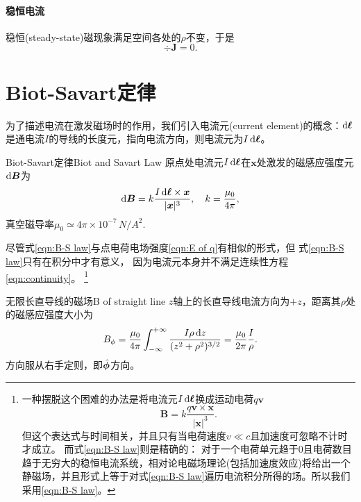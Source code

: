 \paragraph{稳恒电流}
稳恒(steady-state)磁现象满足空间各处的$\rho$不变，于是%
\begin{equation}
    \div\bm J=0.
\end{equation}

\section{Biot-Savart定律}
\label{sec:Biot-Savart law}

为了描述电流在激发磁场时的作用，我们引入电流元(current element)的概念：$\mathop{}\!\mathrm{d}\bm\ell$是通电流$I$的导线的长度元，指向电流方向，则电流元为$I\mathop{}\!\mathrm{d}\bm\ell$。
\begin{theorem}{Biot-Savart定律}{Biot and Savart Law}
    原点处电流元$I\mathop{}\!\mathrm{d}\bm\ell$在$\bm x$处激发的磁感应强度元$\mathop{}\!\mathrm{d}\bm B$为
    \begin{equation}
        \label{eqn:B-S law}
        \mathop{}\!\mathrm{d}\bm B=k\frac{I\mathop{}\!\mathrm{d}\bm\ell\times\bm x}{|\bm x|^3},\quad k=\frac{\mu_0}{4\pi},
    \end{equation}
    真空磁导率$\mu_0\simeq 4\pi\times{10^{-7}}\,\si{N/A^2}.$
\end{theorem}
尽管式\eqref{eqn:B-S law}与点电荷电场强度\eqref{eqn:E of q}有相似的形式，但%
式\eqref{eqn:B-S law}只有在积分中才有意义，
因为电流元本身并不满足连续性方程\eqref{eqn:continuity}。
\footnote{一种摆脱这个困难的办法是将电流元$I\mathop{}\!\mathrm{d}\bm\ell$换成运动电荷$q\bm v$
\[
    \bm B=k\frac{q\bm v\times\bm x}{|\bm x|^3}.
\]
但这个表达式与时间相关，并且只有当电荷速度$v\ll c$且加速度可忽略不计时才成立。
而式\eqref{eqn:B-S law}则是精确的：
对于一个电荷单元趋于0且电荷数目趋于无穷大的稳恒电流系统，相对论电磁场理论(包括加速度效应)将给出一个静磁场，并且形式上等于对式\eqref{eqn:B-S law}遍历电流积分所得的场。所以我们采用\eqref{eqn:B-S law}。}
\begin{example}{无限长直导线的磁场}{B of straight line}
    $z$轴上的长直导线电流方向为$+z$，距离其$\rho$处的磁感应强度大小为
    \[
        B_\phi=\frac{\mu_0}{4\pi}\int_{-\infty}^{+\infty}\frac{I\rho\mathop{}\!\mathrm{d} z}{(z^2+\rho^2)^{3/2}}=\frac{\mu_0}{2\pi}\frac I\rho.
    \]
    方向服从右手定则，即$\mathop{}\!\hat{\bm{\phi}}$方向。
\end{example}
